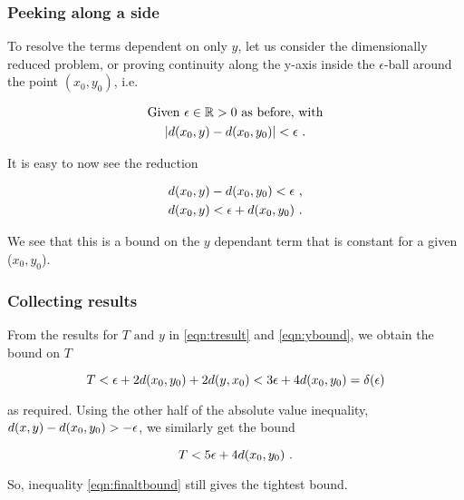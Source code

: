 \begin{frame}
    \frametitle{Peeking along a side}

    To resolve the terms dependent on only \(y\), let us consider
    the dimensionally reduced problem, or proving continuity along the y-axis
    inside the \(\epsilon\)-ball around the point \((x_0, y_0)\), i.e.

    \begin{gather*}
        \text{Given } \epsilon \in \mathbb{R} > 0 \text{ as before, with} \\
        |d(x_0, y) - d(x_0, y_0)| <
        \epsilon~.
    \end{gather*}

    \pause

    It is easy to now see the reduction

    \begin{gather}
        d(x_0, y) - d(x_0, y_0) < \epsilon~, \nonumber \\
        d(x_0, y) < \epsilon + d(x_0, y_0)~.
        \label{eqn:ybound}
    \end{gather}

    We see that this is a bound on the \(y\) dependant term that is constant
    for a given (\(x_0, y_0\)).

\end{frame}

\begin{frame}
    \frametitle{Collecting results}

    From the results for \(T \text{ and } y\) in \autoref{eqn:tresult} and
    \autoref{eqn:ybound}, we obtain the bound on \(T\)

    \begin{equation}
        T < \epsilon + 2d(x_0, y_0) + 2d(y, x_0) < 3\epsilon + 4d(x_0, y_0) = \delta(\epsilon)
        \label{eqn:finaltbound}
    \end{equation}

    as required. Using the other half of the absolute value inequality,
    \(d(x, y) - d(x_0, y_0) > - \epsilon\), we similarly get the
    bound

    \begin{equation*}
        T < 5\epsilon + 4 d(x_0, y_0)~.
    \end{equation*}

    So, inequality \autoref{eqn:finaltbound} still gives the tightest bound.

\end{frame}

